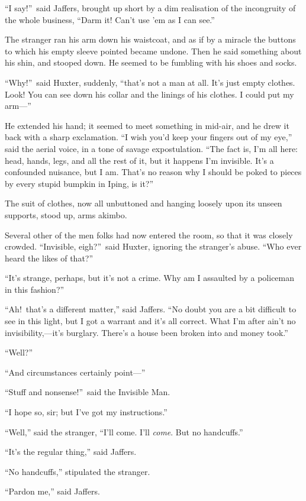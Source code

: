 “I say!”\ said Jaffers, brought up short by a dim realisation of the incongruity of the whole business, “Darm it! Can’t use ’em as I can see.”

The stranger ran his arm down his waistcoat, and as if by a miracle the buttons to which his empty sleeve pointed became undone. Then he said something about his shin, and stooped down. He seemed to be fumbling with his shoes and socks.

“Why!”\ said Huxter, suddenly, “that’s not a man at all. It’s just empty clothes. Look! You can see down his collar and the linings of his clothes. I could put my arm—”

He extended his hand; it seemed to meet something in mid-air, and he drew it back with a sharp exclamation. “I wish you’d keep your fingers out of my eye,” said the aerial voice, in a tone of savage expostulation. “The fact is, I’m all here: head, hands, legs, and all the rest of it, but it happens I’m invisible. It’s a confounded nuisance, but I am. That’s no reason why I should be poked to pieces by every stupid bumpkin in Iping, is it?”

The suit of clothes, now all unbuttoned and hanging loosely upon its unseen supports, stood up, arms akimbo.

Several other of the men folks had now entered the room, so that it was closely crowded. “Invisible, eigh?”\ said Huxter, ignoring the stranger’s abuse. “Who ever heard the likes of that?”

“It’s strange, perhaps, but it’s not a crime. Why am I assaulted by a policeman in this fashion?”

“Ah!\ that’s a different matter,” said Jaffers. “No doubt you are a bit difficult to see in this light, but I got a warrant and it’s all correct. What I’m after ain’t no invisibility,—it’s burglary. There’s a house been broken into and money took.”

“Well?”

“And circumstances certainly point—”

“Stuff and nonsense!”\ said the Invisible Man.

“I hope so, sir; but I’ve got my instructions.”

“Well,” said the stranger, “I’ll come. I’ll \emph{come}. But no handcuffs.”

“It’s the regular thing,” said Jaffers.

“No handcuffs,” stipulated the stranger.

“Pardon me,” said Jaffers.

